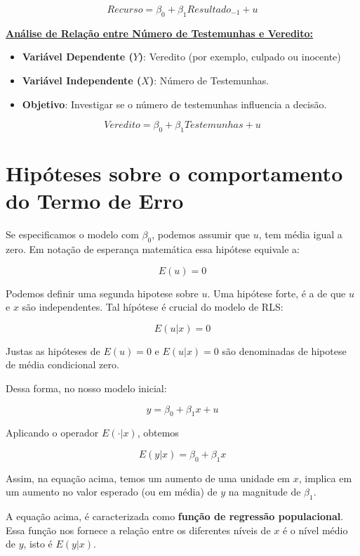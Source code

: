 \documentclass[
  letterpaper,
  DIV=11,
  numbers=noendperiod]{scrreprt}
\providecommand{\tightlist}{%
  \setlength{\itemsep}{0pt}\setlength{\parskip}{0pt}}
\begin{document}
\[Recurso = \beta_0 + \beta_1 Resultado_{-1} + u \]

\ul{\textbf{Análise de Relação entre Número de Testemunhas e Veredito:}}

\begin{itemize}
\tightlist
\item
  \textbf{Variável Dependente (\(Y\))}: Veredito (por exemplo, culpado
  ou inocente)
\item
  \textbf{Variável Independente (\(X\))}: Número de Testemunhas.
\item
  \textbf{Objetivo}: Investigar se o número de testemunhas influencia a
  decisão.
\end{itemize}

\[ Veredito = \beta_0 + \beta_1 Testemunhas + u \]

\section{Hipóteses sobre o comportamento do Termo de
Erro}\label{hipuxf3teses-sobre-o-comportamento-do-termo-de-erro}

Se especificamos o modelo com \(\beta_0\), podemos assumir que \(u\),
tem média igual a zero. Em notação de esperança matemática essa hipótese
equivale a:

\[E(u) = 0\]

Podemos definir uma segunda hipotese sobre \(u\). Uma hipótese forte, é
a de que \(u\) e \(x\) são independentes. Tal hípótese é crucial do
modelo de RLS:

\[E(u|x) = 0\]

Justas as hipóteses de \(E(u) = 0\) e \(E(u|x) = 0\) são denominadas de
hipotese de média condicional zero.

Dessa forma, no nosso modelo inicial:

\[y = \beta_0 + \beta_1x + u\]

Aplicando o operador \(E( \cdot |x )\), obtemos

\[ E( y |x ) = \beta_0 + \beta_1x \]

Assim, na equação acima, temos um aumento de uma unidade em \(x\),
implica em um aumento no valor esperado (ou em média) de \(y\) na
magnitude de \(\beta_1\).

A equação acima, é caracterizada como \textbf{função de regressão
populacional}. Essa função nos fornece a relação entre os diferentes
níveis de \(x\) é o nível médio de \(y\), isto é \(E( y |x )\).
\end{document}
